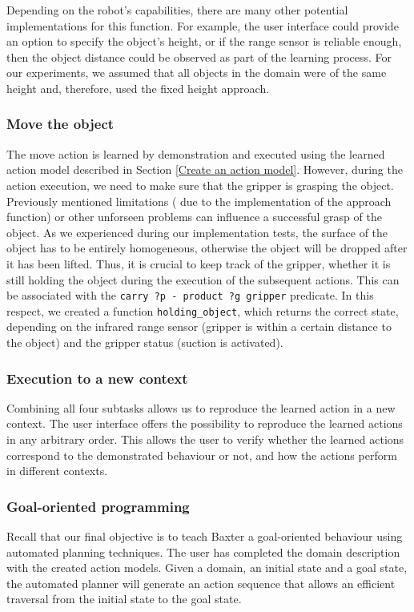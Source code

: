 Depending on the robot's capabilities, there are many other potential implementations for this function.
For example, the user interface could provide an option to specify the object's height, or if the range sensor is reliable enough, then the object distance could be observed as part of the learning process.
For our experiments, we assumed that all objects in the domain were of the same height and, therefore, used the fixed height approach.


\subsubsection{Move the object}\label{holdingObject}
The move action is learned by demonstration and executed using the learned action model described in Section \ref{Create an action model}.
However, during the action execution, we need to make sure that the gripper is grasping the object.
Previously mentioned limitations (\eg
due to the implementation of the approach function) or other unforseen problems can influence a successful grasp of the object.
As we experienced during our implementation tests, the surface of the object has to be entirely homogeneous, otherwise the object will be dropped after it has been lifted.
Thus, it is crucial to keep track of the gripper, \ie
whether it is still holding the object during the execution of the subsequent actions.
This can be associated with the \texttt{carry ?p - product ?g gripper} predicate.
In this respect, we created a function \texttt{holding_object}, which returns the correct state, depending on the infrared range sensor (gripper is within a certain distance to the object) and the gripper status (suction is activated).

\subsubsection{Execution to a new context}
Combining all four subtasks allows us to reproduce the learned action in a new context.
The user interface offers the possibility to reproduce the learned actions in any arbitrary order.
This allows the user to verify whether the learned actions correspond to the demonstrated behaviour or not, and how the actions perform in different contexts.

\subsubsection{Goal-oriented programming}
Recall that our final objective is to teach Baxter a goal-oriented behaviour using automated planning techniques.
The user has completed the domain description with the created action models.
Given a domain, an initial state and a goal state, the automated planner will generate an action sequence that allows an efficient traversal from the initial state to the goal state.

